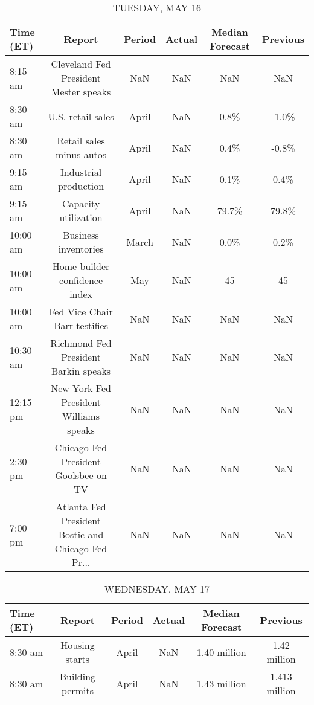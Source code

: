 \documentclass{article}%
\begin{document}
\begin{table}[htbp]%
\caption{TUESDAY, MAY 16}%
\centering%
\begin{adjustbox}{width=1\textwidth}%
\begin{tabular}{lccccc}
\toprule
Time (ET) &                                             Report & Period & Actual & Median Forecast & Previous \\
\midrule
  8:15 am &              Cleveland Fed President Mester speaks &    NaN &    NaN &             NaN &      NaN \\
  8:30 am &                                  U.S. retail sales &  April &    NaN &            0.8\% &    -1.0\% \\
  8:30 am &                           Retail sales minus autos &  April &    NaN &            0.4\% &    -0.8\% \\
  9:15 am &                              Industrial production &  April &    NaN &            0.1\% &     0.4\% \\
  9:15 am &                               Capacity utilization &  April &    NaN &           79.7\% &    79.8\% \\
 10:00 am &                               Business inventories &  March &    NaN &            0.0\% &     0.2\% \\
 10:00 am &                      Home builder confidence index &    May &    NaN &              45 &       45 \\
 10:00 am &                      Fed Vice Chair Barr testifies &    NaN &    NaN &             NaN &      NaN \\
 10:30 am &               Richmond Fed President Barkin speaks &    NaN &    NaN &             NaN &      NaN \\
 12:15 pm &             New York Fed President Williams speaks &    NaN &    NaN &             NaN &      NaN \\
  2:30 pm &               Chicago Fed President Goolsbee on TV &    NaN &    NaN &             NaN &      NaN \\
  7:00 pm & Atlanta Fed President Bostic and Chicago Fed Pr... &    NaN &    NaN &             NaN &      NaN \\
\bottomrule
\end{tabular}
%
\end{adjustbox}%
\end{table}

%


\begin{table}[htbp]%
\caption{WEDNESDAY, MAY 17}%
\centering%
\begin{adjustbox}{width=1\textwidth}%
\begin{tabular}{lccccc}
\toprule
Time (ET) &           Report & Period & Actual & Median Forecast &      Previous \\
\midrule
  8:30 am &   Housing starts &  April &    NaN &    1.40 million &  1.42 million \\
  8:30 am & Building permits &  April &    NaN &    1.43 million & 1.413 million \\
\bottomrule
\end{tabular}
%
\end{adjustbox}%
\end{table}
\end{document}
